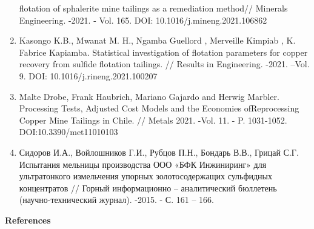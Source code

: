 \begin{enumerate}
  flotation of sphalerite mine tailings as a remediation method//
  Minerals Engineering. -2021. - Vol. 165. DOI:
  10.1016/j.mineng.2021.106862
\item
  Kasongo K.B., Mwanat M. H., Ngamba Guellord , Merveille Kimpiab , K.
  Fabrice Kapiamba. Statistical investigation of flotation parameters
  for copper recovery from sulfide flotation tailings. // Results in
  Engineering. -2021. --Vol. 9. DOI: 10.1016/j.rineng.2021.100207
\item
  Malte Drobe, Frank Haubrich, Mariano Gajardo and Herwig Marbler.
  Processing Tests, Adjusted Cost Models and the Economies
  ofReprocessing Copper Mine Tailings in Chile. // Metals 2021. -Vol.
  11. - P. 1031-1052. DOI:10.3390/met11010103
\item
  Сидоров И.А., Войлошников Г.И., Рубцов П.Н., Бондарь В.В., Грицай С.Г.
  Испытания мельницы производства ООО «БФК Инжиниринг» для ультратонкого
  измельчения упорных золотосодержащих сульфидных концентратов // Горный
  информационно -- аналитический бюллетень (научно-технический журнал).
  -2015. - С. 161 -- 166.
\end{enumerate}

{\bfseries References}

